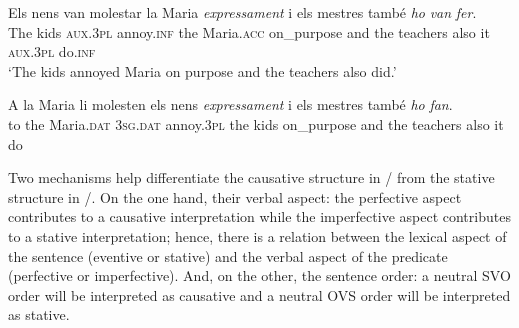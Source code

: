 \documentclass[output=paper,colorlinks,citecolor=brown,modfonts,nonflat]{langsci/langscibook}
\begin{document}
\ea%
 \label{ex:royo:3}
 \ea \label{ex:royo:3a}
 \gll Els nens van molestar la Maria \emph{expressament} i els mestres també \emph{ho} \emph{van} \emph{fer}. \\
The kids \textsc{aux.3pl} annoy.\textsc{inf} the Maria.\textsc{acc} on\_purpose     and the teachers also     it  \textsc{aux.3pl} do.\textsc{inf}\\
 \glt ‘The kids annoyed Maria on purpose and the teachers also did.’

 \ex \label{ex:royo:3b}
 \gll *A la Maria li molesten els nens \emph{expressament} i els mestres també \emph{ho} \emph{fan}.\\
  to the Maria.\textsc{dat} \textsc{3sg.dat} annoy.\textsc{3pl} the kids on\_purpose     and the teachers also    it   do\\
\glt

 \z
 \z

Two mechanisms help differentiate the causative structure in / from the stative structure in /. On the one hand, their verbal aspect: the perfective aspect contributes to a causative interpretation while the imperfective aspect contributes to a stative interpretation; hence, there is a relation between the lexical aspect of the sentence (eventive or stative) and the verbal aspect of the predicate (perfective or imperfective). And, on the other, the sentence order: a neutral SVO order will be interpreted as causative and a neutral OVS order will be interpreted as stative.
\end{document}
